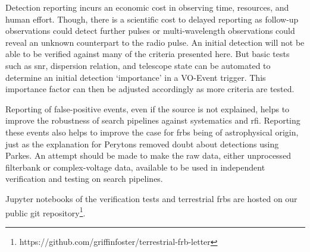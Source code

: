 \documentclass[a4paper,fleqn,usenatbib]{mnras}
\begin{document}
Detection reporting incurs an economic cost in observing time, resources, and
human effort. Though, there is a scientific cost to delayed reporting as
follow-up observations could detect further pulses or multi-wavelength
observations could reveal an unknown counterpart to the radio pulse. An initial
detection will not be able to be verified against many of the criteria presented
here. But basic tests such as \gls{snr}, dispersion relation, and telescope
state can be automated to determine an initial detection `importance' in a
VO-Event trigger. This importance factor can then be adjusted accordingly as
more criteria are tested.

Reporting of false-positive events, even if the source is not explained, helps
to improve the robustness of search pipelines against systematics and \gls{rfi}.
Reporting these events also helps to improve the case for \glspl{frb} being of
astrophysical origin, just as the explanation for Perytons
\citep{2015MNRAS.451.3933P} removed doubt about detections using Parkes. An
attempt should be made to make the raw data, either unprocessed filterbank or
complex-voltage data, available to be used in independent verification and
testing on search pipelines.

Jupyter notebooks of the verification tests and terrestrial \glspl{frb} are
hosted on our public git
repository\footnote{https://github.com/griffinfoster/terrestrial-frb-letter}.


 

\bsp	%
\label{lastpage}
\end{document}
